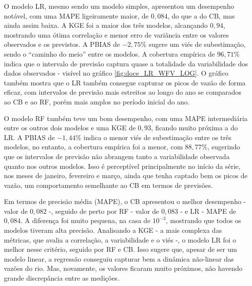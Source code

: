 O modelo LR, mesmo sendo um modelo simples, apresentou um desempenho notável, com uma MAPE ligeiramente maior, de $0,084$, do que a do CB, mas ainda assim baixa. A KGE foi a maior dos três modelos, alcançando $0,94$, mostrando uma ótima correlação e menor erro de variância entre os valores observados e os previstos. A PBIAS de $-2,75\%$ sugere um viés de subestimação, sendo o ``caminho do meio'' entre os modelos. A cobertura empírica de $96,71\%$ indica que o intervalo de previsão captura quase a totalidade da variabilidade dos dados observados - visível no gráfico \ref{fig:doce_LR_WFV_LOG}. O gráfico também mostra que o LR também consegue capturar os picos de vazão de forma eficaz, com intervalos de previsão mais estreitos ao longo do ano se comparados ao CB e ao RF, porém mais amplos no período inicial do ano.

O modelo RF também teve um bom desempenho, com uma MAPE intermediária entre os outros dois modelos e uma KGE de $0,93$, ficando muito próxima a do LR. A PBIAS de $-1,44\%$ indica o menor viés de subestimação entre os três modelos, no entanto, a cobertura empírica foi a menor, com $88,77\%$, sugerindo que os intervalos de previsão não abrangem tanto a variabilidade observada quanto nos outros modelos. Isso é perceptível principalmente no início da série, nos meses de janeiro, fevereiro e março, ainda que tenha captado bem os picos de vazão, um comportamento semelhante ao CB em termos de previsões.

Em termos de precisão média (MAPE), o CB apresentou o melhor desempenho - valor de $0,082$ -, seguido de perto por RF - valor de $0,083$ - e LR - MAPE de $0,084$. A diferença foi muito pequena, na casa de $10^{-3}$, mostrando que todos os modelos tiveram alta precisão. Analisando a KGE - a mais complexa das métricas, que avalia a correlação, a variabilidade e o viés -, o modelo LR foi o melhor nesse critério, seguido por RF e CB. Isso sugere que, apesar de ser um modelo linear, a regressão conseguiu capturar bem a dinâmica não-linear das vazões do rio. Mas, novamente, os valores ficaram muito próximos, não havendo grande discrepância entre as medições.


